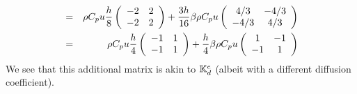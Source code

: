 \begin{eqnarray}
\nonumber\\
&=& \rho C_p u \frac{h}{8}
\left(\begin{array}{cc}
-2 & 2 \\
-2 & 2
\end{array}\right)  
+
\frac{3h}{16}\beta
\rho C_p u 
\left(\begin{array}{cc}
4/3 & -4/3 \\
-4/3 & 4/3 
\end{array}\right)   \nonumber\\
&=& \rho C_p u \frac{h}{4}
\left(\begin{array}{cc}
-1 & 1 \\
-1 & 1
\end{array}\right) 
+
\frac{h}{4}\beta
\rho C_p u 
\left(\begin{array}{cc}
1 & -1 \\
-1 & 1 
\end{array}\right)  
\end{eqnarray}
We see that this additional matrix is akin to ${{\mathbb{K}}}_d^e$ (albeit with a 
different diffusion coefficient).

